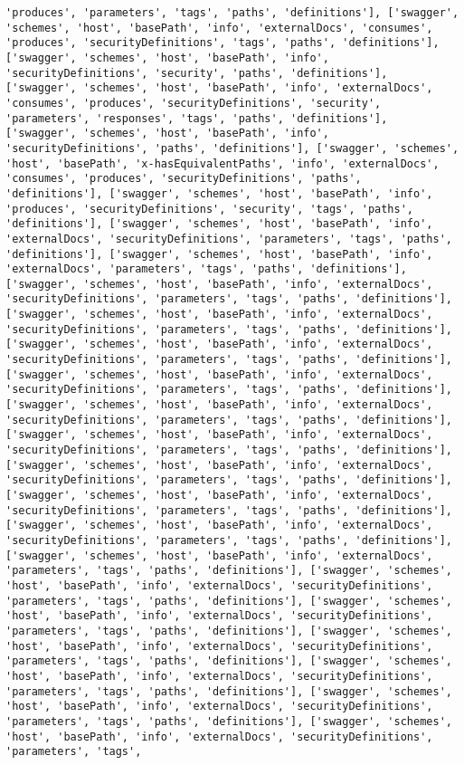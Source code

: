\documentclass[11pt]{article}
\begin{document}
\begin{Verbatim}[commandchars=\\\{\}]
'produces', 'parameters', 'tags', 'paths', 'definitions'], ['swagger', 'schemes', 'host', 'basePath', 'info', 'externalDocs', 'consumes', 'produces', 'securityDefinitions', 'tags', 'paths', 'definitions'], ['swagger', 'schemes', 'host', 'basePath', 'info', 'securityDefinitions', 'security', 'paths', 'definitions'], ['swagger', 'schemes', 'host', 'basePath', 'info', 'externalDocs', 'consumes', 'produces', 'securityDefinitions', 'security', 'parameters', 'responses', 'tags', 'paths', 'definitions'], ['swagger', 'schemes', 'host', 'basePath', 'info', 'securityDefinitions', 'paths', 'definitions'], ['swagger', 'schemes', 'host', 'basePath', 'x-hasEquivalentPaths', 'info', 'externalDocs', 'consumes', 'produces', 'securityDefinitions', 'paths', 'definitions'], ['swagger', 'schemes', 'host', 'basePath', 'info', 'produces', 'securityDefinitions', 'security', 'tags', 'paths', 'definitions'], ['swagger', 'schemes', 'host', 'basePath', 'info', 'externalDocs', 'securityDefinitions', 'parameters', 'tags', 'paths', 'definitions'], ['swagger', 'schemes', 'host', 'basePath', 'info', 'externalDocs', 'parameters', 'tags', 'paths', 'definitions'], ['swagger', 'schemes', 'host', 'basePath', 'info', 'externalDocs', 'securityDefinitions', 'parameters', 'tags', 'paths', 'definitions'], ['swagger', 'schemes', 'host', 'basePath', 'info', 'externalDocs', 'securityDefinitions', 'parameters', 'tags', 'paths', 'definitions'], ['swagger', 'schemes', 'host', 'basePath', 'info', 'externalDocs', 'securityDefinitions', 'parameters', 'tags', 'paths', 'definitions'], ['swagger', 'schemes', 'host', 'basePath', 'info', 'externalDocs', 'securityDefinitions', 'parameters', 'tags', 'paths', 'definitions'], ['swagger', 'schemes', 'host', 'basePath', 'info', 'externalDocs', 'securityDefinitions', 'parameters', 'tags', 'paths', 'definitions'], ['swagger', 'schemes', 'host', 'basePath', 'info', 'externalDocs', 'securityDefinitions', 'parameters', 'tags', 'paths', 'definitions'], ['swagger', 'schemes', 'host', 'basePath', 'info', 'externalDocs', 'securityDefinitions', 'parameters', 'tags', 'paths', 'definitions'], ['swagger', 'schemes', 'host', 'basePath', 'info', 'externalDocs', 'securityDefinitions', 'parameters', 'tags', 'paths', 'definitions'], ['swagger', 'schemes', 'host', 'basePath', 'info', 'externalDocs', 'securityDefinitions', 'parameters', 'tags', 'paths', 'definitions'], ['swagger', 'schemes', 'host', 'basePath', 'info', 'externalDocs', 'parameters', 'tags', 'paths', 'definitions'], ['swagger', 'schemes', 'host', 'basePath', 'info', 'externalDocs', 'securityDefinitions', 'parameters', 'tags', 'paths', 'definitions'], ['swagger', 'schemes', 'host', 'basePath', 'info', 'externalDocs', 'securityDefinitions', 'parameters', 'tags', 'paths', 'definitions'], ['swagger', 'schemes', 'host', 'basePath', 'info', 'externalDocs', 'securityDefinitions', 'parameters', 'tags', 'paths', 'definitions'], ['swagger', 'schemes', 'host', 'basePath', 'info', 'externalDocs', 'securityDefinitions', 'parameters', 'tags', 'paths', 'definitions'], ['swagger', 'schemes', 'host', 'basePath', 'info', 'externalDocs', 'securityDefinitions', 'parameters', 'tags', 'paths', 'definitions'], ['swagger', 'schemes', 'host', 'basePath', 'info', 'externalDocs', 'securityDefinitions', 'parameters', 'tags', 
\end{Verbatim}
\end{document}

